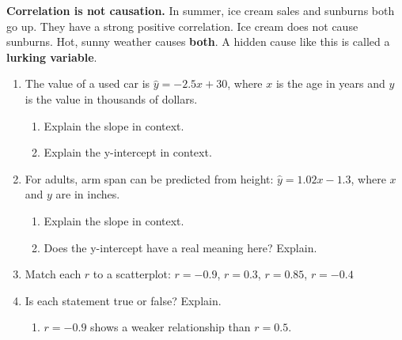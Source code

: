 \documentclass[11pt]{article}
\begin{document}
\vspace{1em}
\textbf{Correlation is not causation.} In summer, ice cream sales and sunburns both go up. They have a strong positive correlation.
Ice cream does not cause sunburns. Hot, sunny weather causes \textbf{both}. A hidden cause like this is called a \textbf{lurking variable}.

\partner

\newpage
\begin{enumerate}

\item The value of a used car is $\hat{y} = -2.5x + 30$, where $x$ is the age in years and $y$ is the value in thousands of dollars.
\begin{enumerate}[itemsep=1em]
  \item Explain the slope in context.

  \work{2.5em}
  \item Explain the y-intercept in context.

\end{enumerate}
\work{2.5em}

\item For adults, arm span can be predicted from height: $\hat{y} = 1.02x - 1.3$, where $x$ and $y$ are in inches.
\begin{enumerate}[itemsep=1em]
  \item Explain the slope in context.

  \work{2.5em}
  \item Does the y-intercept have a real meaning here? Explain.

\end{enumerate}
\work{2.5em}

\item Match each $r$ to a scatterplot: \quad $r = -0.9$, \; $r = 0.3$, \; $r = 0.85$, \; $r = -0.4$
\begin{center}\end{center}
\work{3em}

\newpage
\item Is each statement true or false? Explain.
\begin{enumerate}[itemsep=3.2em]
  \item $r = -0.9$ shows a weaker relationship than $r = 0.5$.


\end{enumerate}
\end{enumerate}
\end{document}
